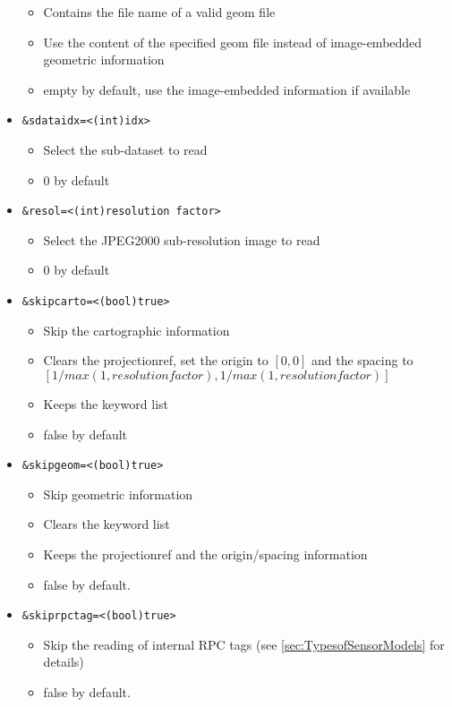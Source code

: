 \begin{itemize}
  \begin{itemize}
  \item Contains the file name of a valid geom file
  \item Use the content of the specified geom file instead of image-embedded
    geometric information
  \item empty by default, use the image-embedded information if available
  \end{itemize}  
\item \begin{verbatim}&sdataidx=<(int)idx>\end{verbatim}
  \begin{itemize}
  \item Select the sub-dataset to read
  \item 0 by default
  \end{itemize}
\item \begin{verbatim}&resol=<(int)resolution factor>\end{verbatim}
  \begin{itemize}
  \item Select the JPEG2000 sub-resolution image to read
  \item 0 by default
  \end{itemize}
\item \begin{verbatim}&skipcarto=<(bool)true>\end{verbatim}
  \begin{itemize}
  \item Skip the cartographic information
  \item Clears the projectionref, set the origin to $[0,0]$ and the spacing to $[1/max(1,resolution factor),1/max(1,resolution factor)]$
  \item Keeps the keyword list
  \item false by default 
  \end{itemize}
\item \begin{verbatim}&skipgeom=<(bool)true>\end{verbatim}
  \begin{itemize}
  \item Skip geometric information
  \item Clears the keyword list
  \item Keeps the projectionref and the origin/spacing information
  \item false by default. 
  \end{itemize}
\item \begin{verbatim}&skiprpctag=<(bool)true>\end{verbatim}
  \begin{itemize}
  \item Skip the reading of internal RPC tags (see \ref{sec:TypesofSensorModels} for details)
  \item false by default. 
  \end{itemize}
\end{itemize}

